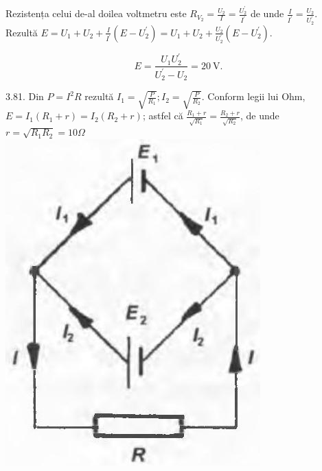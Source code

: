 \documentclass[10pt]{article}
\begin{document}
Rezistența celui de-al doilea voltmetru este $R_{V_{2}}=\frac{U_{2}}{I}=\frac{U_{2}^{\prime}}{I^{\prime}}$ de unde $\frac{I}{I^{\prime}}=\frac{U_{2}}{U_{2}^{\prime}}$. Rezultă $E=U_{1}+U_{2}+\frac{I}{I^{\prime}}\left(E-U_{2}^{\prime}\right)=U_{1}+U_{2}+\frac{U_{2}}{U_{2}^{\prime}}\left(E-U_{2}^{\prime}\right)$.

$$
E=\frac{U_{1} U_{2}^{\prime}}{U_{2}^{\prime}-U_{2}}=20 \mathrm{~V} .
$$

3.81. Din $P=I^{2} R$ rezultă $I_{1}=\sqrt{\frac{P}{R_{1}}} ; I_{2}=\sqrt{\frac{P}{R_{2}}}$. Conform legii lui Ohm, $E=I_{1}\left(R_{1}+r\right)=I_{2}\left(R_{2}+r\right)$; astfel că $\frac{R_{1}+r}{\sqrt{R_{1}}}=\frac{R_{2}+r}{\sqrt{R_{2}}}$, de unde $r=\sqrt{R_{1} R_{2}}=10 \Omega$\\
\includegraphics[max width=\textwidth, center]{2025_07_01_5b3ff9fa0d508c8e9f17g-357}
\end{document}
